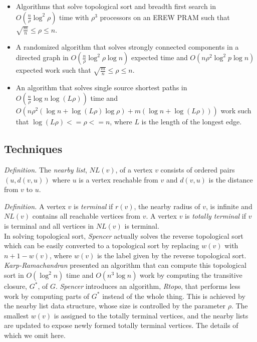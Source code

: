 \documentclass[paper=a4, fontsize=11pt]{scrartcl} %
\numberwithin{equation}{section} %
\numberwithin{figure}{section} %
\numberwithin{table}{section} %
\begin{document}
\begin{itemize}
\item Algorithms that solve topological sort and breadth first search in $O(\frac{n}{\rho}\log^2{\rho})$ time with $\rho^3$ processors on an EREW PRAM such that $ \sqrt{\frac{m}{n}} \leq \rho \leq n$.
\item A randomized algorithm that solves strongly connected components in a directed graph in $O(\frac{n}{\rho}\log^2{\rho}\log{n})$ expected time and $O(n\rho^2\log^2{p}\log{n})$ expected work such that $ \sqrt{\frac{m}{n}} \leq \rho \leq n$.
\item An algorithm that solves single source shortest paths in $O(\frac{n}{\rho}\log{n}\log{(L\rho)})$ time and $O(n\rho^2(\log{n} + \log{(L\rho)}\log{\rho}) + m(\log{n} + \log{(L\rho)}))$ work such that $\log{(L\rho)} <= \rho <= n$, where $L$ is the length of the longest edge.
\end{itemize}

\subsection{Techniques}
\hfill

\textit{Definition.} The \textit{nearby list}, $NL(v)$, of a vertex $v$ consists of ordered pairs $(u, d(v,u))$ where $u$ is a vertex reachable from $v$ and $d(v,u)$ is the distance from $v$ to $u$.

\textit{Definition.} A vertex $v$ is \textit{terminal} if $r(v)$, the nearby radius of $v$, is infinite and $NL(v)$ contains all reachable vertices from $v$. A vertex $v$ is \textit{totally terminal} if $v$ is terminal and all vertices in $NL(v)$ is terminal.\\

In solving topological sort, \textit{Spencer\cite{S97}} actually solves the reverse topological sort which can be easily converted to a topological sort by replacing $w(v)$ with $n + 1 - w(v)$, where $w(v)$ is the label given by the reverse topological sort. \textit{Karp-Ramachandran\cite{KR90}} presented an algorithm that can compute this topological sort in $O(\log^2{n})$ time and $O(n^3\log{n})$ work by computing the transitive closure, $G^*$, of $G$. \textit{Spencer\cite{S97}} introduces an algorithm, \textit{Rtopo}, that performs less work by computing parts of $G^*$ instead of the whole thing. This is achieved by the nearby list data structure, whose size is controlled by the parameter $\rho$. The smallest $w(v)$ is assigned to the totally terminal vertices, and the nearby lists are updated to expose newly formed totally terminal vertices. The details of which we omit here.\\   
\end{document}
